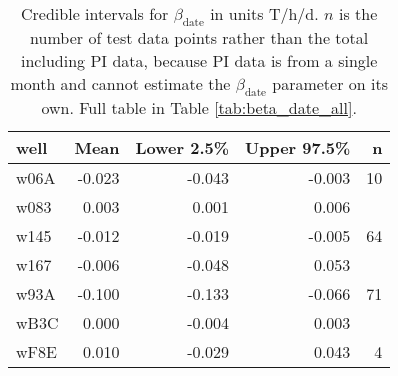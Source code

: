 \begin{table}[]
\centering
\begin{tabular}{lrrrr}
  \hline
well & Mean & Lower 2.5\% & Upper 97.5\% & n \\ 
  \hline
w06A & -0.023 & -0.043 & -0.003 &   10 \\ 
  w083 & 0.003 & 0.001 & 0.006 &  \\ 
  w145 & -0.012 & -0.019 & -0.005 &   64 \\ 
  w167 & -0.006 & -0.048 & 0.053 &  \\ 
  w93A & -0.100 & -0.133 & -0.066 &   71 \\ 
  wB3C & 0.000 & -0.004 & 0.003 &  \\ 
  wF8E & 0.010 & -0.029 & 0.043 &    4 \\ 
   \hline
\end{tabular}
\caption{Credible intervals for $\beta_\text{date}$ in units T/h/d. $n$ is the number of test data points rather than the total including PI data, because PI data is from a single month and cannot estimate the $\beta_\text{date}$ parameter on its own. Full table in Table \ref{tab:beta_date_all}.} 
\label{tab:beta_date}
\end{table}
